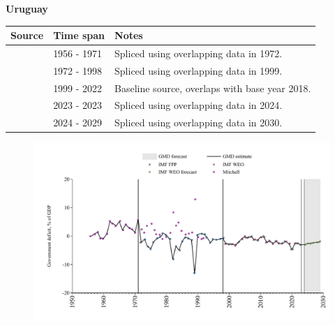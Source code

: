 \documentclass[12pt,a4paper,landscape]{article}
\begin{document}
\begin{adjustbox}{max totalsize={\paperwidth}{\paperheight},center}
\begin{minipage}[t][\textheight][t]{\textwidth}
\vspace*{0.5cm}
{}
\begin{center}
{\Large\bfseries Uruguay}
\end{center}
\vspace{0.5cm}
\begin{table}[H]
\centering
\small
\begin{tabular}{|l|l|l|}
\hline
\textbf{Source} & \textbf{Time span} & \textbf{Notes} \\
\hline
\rowcolor{white}\cite{Mitchell}& 1956 - 1971 &Spliced using overlapping data in 1972.\\
\rowcolor{lightgray}\cite{IMF_FPP}& 1972 - 1998 &Spliced using overlapping data in 1999.\\
\rowcolor{white}\cite{IMF_WEO}& 1999 - 2022 &Baseline source, overlaps with base year 2018.\\
\rowcolor{lightgray}\cite{IMF_FPP}& 2023 - 2023 &Spliced using overlapping data in 2024.\\
\rowcolor{white}\cite{IMF_WEO_forecast}& 2024 - 2029 &Spliced using overlapping data in 2030.\\
\hline
\end{tabular}
\end{table}
\begin{figure}[H]
\centering
\includegraphics[width=\textwidth,height=0.6\textheight,keepaspectratio]{graphs/URY_govdef_GDP.pdf}
\end{figure}
\end{minipage}
\end{adjustbox}
\end{document}
